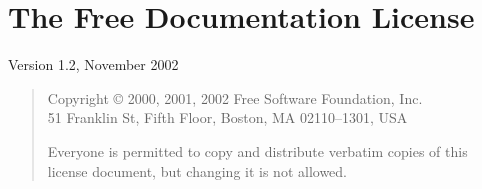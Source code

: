 

\chapter[\acronym{GNU} \acronym{FDL}\commonpart]%
{\label{sec:fdl}%
  The  Free Documentation License\commonpart}

Version 1.2, November 2002

\begin{quotation}
  \noindent Copyright \copyright{} 2000, 2001, 2002 Free Software Foundation, Inc. \\ 51
  Franklin St, Fifth Floor, Boston, MA 02110--1301, USA

  Everyone is permitted to copy and distribute verbatim copies of this license document, but
  changing it is not allowed.
\end{quotation}

